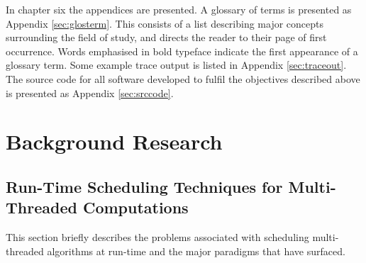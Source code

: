 In chapter six the appendices are presented.
A glossary of terms is presented as Appendix \ref{sec:glosterm}. 
This consists of a list describing major concepts surrounding the field of study, and directs the reader to their page of first occurrence. 
Words emphasised in bold typeface indicate the first appearance of a glossary term.
Some example trace output is listed in Appendix \ref{sec:traceout}.
The source code for all software developed to fulfil the objectives described above is presented as Appendix \ref{sec:srccode}.





\chapter{Background Research}
\label{ch:backres}

\section{Run-Time Scheduling Techniques for Multi-Threaded Computations}
This section briefly describes the problems associated with \gls{scheduling} \glspl{multi-threaded algorithm} at run-time and
the major paradigms that have surfaced.

